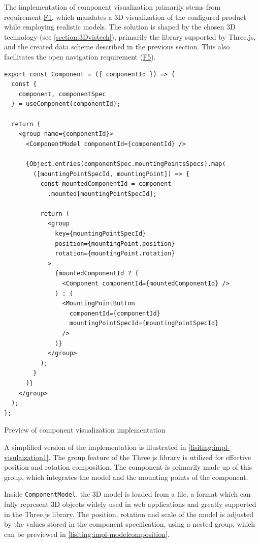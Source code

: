 The implementation of component visualization primarily stems from requirement \hyperref[itm:F1]{F1}, which mandates a 3D visualization of the configured product while employing realistic models. The solution is shaped by the chosen 3D technology (see \autoref{section:3Dvistech}), primarily the  library supported by Three.js, and the created data scheme described in the previous section. This also facilitates the open navigation requirement (\hyperref[itm:F5]{F5}).

\begin{listing}[h!]
\begin{verbatim}
export const Component = ({ componentId }) => {
  const { 
    component, componentSpec
  } = useComponent(componentId);

  return (
    <group name={componentId}>
      <ComponentModel componentId={componentId} />

      {Object.entries(componentSpec.mountingPointsSpecs).map(
        ([mountingPointSpecId, mountingPoint]) => {
          const mountedComponentId = component
            .mounted[mountingPointSpecId];

          return (
            <group
              key={mountingPointSpecId}
              position={mountingPoint.position}
              rotation={mountingPoint.rotation}
            >
              {mountedComponentId ? (
                <Component componentId={mountedComponentId} />
              ) : (
                <MountingPointButton
                  componentId={componentId}
                  mountingPointSpecId={mountingPointSpecId}
                />
              )}
            </group>
          );
        }
      )}
    </group>
  );
};
\end{verbatim}
\caption{Preview of component visualization implementation}
\label{lisiting:impl-visulaization1}
\end{listing}

A simplified version of the implementation is illustrated in \autoref{lisiting:impl-visulaization1}. The group feature of the Three.js library is utilized for effective position and rotation composition. The component is primarily made up of this group, which integrates the model and the mounting points of the component.

Inside \texttt{ComponentModel}, the 3D model is loaded from a  file, a format which can fully represent 3D objects widely used in web applications and greatly supported in the Three.js library. The position, rotation and scale of the model is adjusted by the values stored in the component specification, using a nested  group, which can be previewed in \autoref{lisiting:impl-modelcomposition}.

